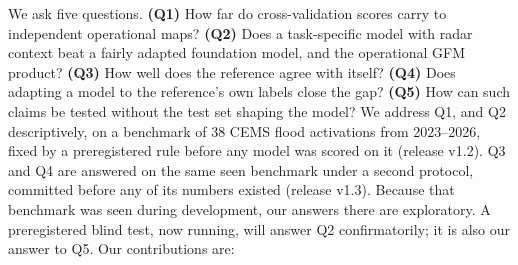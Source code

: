 \documentclass[10pt,twocolumn,a4paper]{article}
\begin{document}
We ask five questions. \textbf{(Q1)} How far do cross-validation scores carry to independent operational maps?
\textbf{(Q2)} Does a task-specific model with radar context beat a fairly adapted foundation model, and the operational
GFM product? \textbf{(Q3)} How well does the reference agree with itself? \textbf{(Q4)} Does adapting a model to the
reference's own labels close the gap? \textbf{(Q5)} How can such claims be tested without the test set shaping the
model? We address Q1, and Q2 descriptively, on a benchmark of 38 CEMS flood activations from 2023--2026, fixed by a
preregistered rule before any model was scored on it (release v1.2). Q3 and Q4 are answered on the same seen
benchmark under a second protocol, committed before any of its numbers existed (release v1.3). Because that benchmark
was seen during development, our answers there are exploratory. A preregistered blind test, now running, will answer
Q2 confirmatorily; it is also our answer to Q5. Our contributions are:
\end{document}

